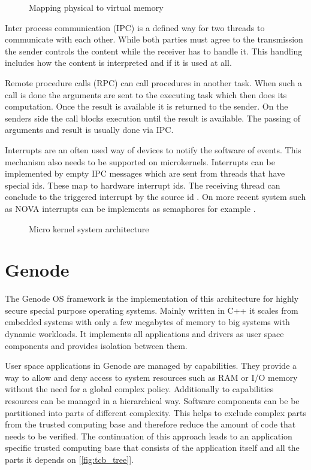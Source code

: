 \documentclass[
a4paper,
11pt,
twoside
]{report}
\begin{document}
		\begin{figure}
			\centering
			\def\svgwidth{0.8\textwidth}
			
			\caption{Mapping physical to virtual memory}
			\label{mapping}    
		\end{figure}
		
		Inter process communication (IPC) is a defined way for two threads to communicate with each other.
		While both parties must agree to the transmission the sender controls the content while the receiver has to handle it.
		This handling includes how the content is interpreted and if it is used at all.
		
		Remote procedure calls (RPC) can call procedures in another task.
		When such a call is done the arguments are sent to the executing task which then does its computation.
		Once the result is available it is returned to the sender.
		On the senders side the call blocks execution until the result is available.
		The passing of arguments and result is usually done via IPC.
		
		Interrupts are an often used way of devices to notify the software of events.
		This mechanism also needs to be supported on microkernels.
		Interrupts can be implemented by empty IPC messages which are sent from threads that have special ids.
		These map to hardware interrupt ids.
		The receiving thread can conclude to the triggered interrupt by the source id \citep{Liedtke_1995}.
		On more recent system such as NOVA interrupts can be implements as semaphores for example \citep{Steinberg:2010:NMS:1755913.1755935}.
		
		\begin{figure}
			\centering
			\def\svgwidth{0.8\textwidth}
			
			\caption{Micro kernel system architecture}
			\label{microkernel}    
		\end{figure}
		
		\section{Genode}
		
		The Genode OS framework is the implementation of this architecture for highly secure special purpose operating systems.
		Mainly written in C++ it scales from embedded systems with only a few megabytes of memory to big systems with dynamic workloads.
		It implements all applications and drivers as user space components and provides isolation between them.
		
		User space applications in Genode are managed by capabilities.
		They provide a way to allow and deny access to system resources such as RAM or I/O memory without the need for a global complex policy.
		Additionally to capabilities resources can be managed in a hierarchical way.
		Software components can be be partitioned into parts of different complexity.
		This helps to exclude complex parts from the trusted computing base and therefore reduce the amount of code that needs to be verified.
		The continuation of this approach leads to an application specific trusted computing base that consists of the application itself and all the parts it depends on [\ref{fig:tcb_tree}].
		\citep{genode}
		
\end{document}
